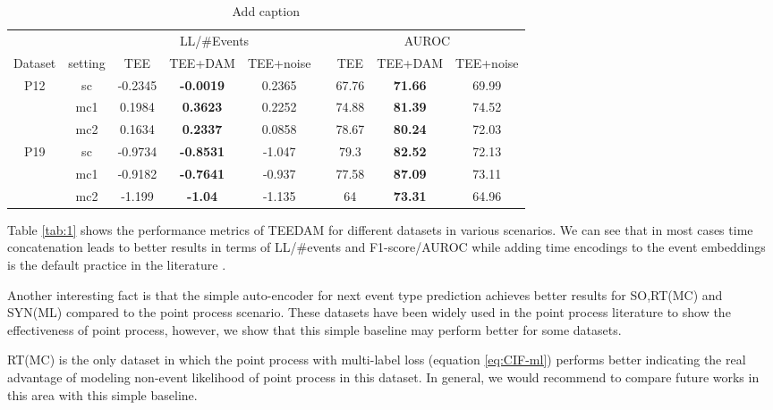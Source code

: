 \documentclass[journal,twoside,web]{ieeecolor}
\begin{document}
 
\begin{table}[htbp]
    \centering
    \caption{Add caption}
      \begin{tabular}{ccccccccc}
      \toprule
      \toprule
            &       & \multicolumn{3}{c}{LL/\#Events} &       & \multicolumn{3}{c}{AUROC} \\
  \cmidrule{3-5}\cmidrule{7-9}    Dataset & setting & TEE   & TEE+DAM & TEE+noise &       & TEE   & TEE+DAM & TEE+noise \\
      \midrule
      \multirow{3}[2]{*}{P12} & sc    & -0.2345 & \textbf{-0.0019} & 0.2365 &       & 67.76 & \textbf{71.66} & 69.99 \\
            & mc1   & 0.1984 & \textbf{0.3623} & 0.2252 &       & 74.88 & \textbf{81.39} & 74.52 \\
            & mc2   & 0.1634 & \textbf{0.2337} & 0.0858 &       & 78.67 & \textbf{80.24} & 72.03 \\
      \midrule
      \multirow{3}[2]{*}{P19} & sc    & -0.9734 & \textbf{-0.8531} & -1.047 &       & 79.3  & \textbf{82.52} & 72.13 \\
            & mc1   & -0.9182 & \textbf{-0.7641} & -0.937 &       & 77.58 & \textbf{87.09} & 73.11 \\
            & mc2   & -1.199 & \textbf{-1.04} & -1.135 &       & 64    & \textbf{73.31} & 64.96 \\
      \bottomrule
      \bottomrule
      \end{tabular}%
    \label{tab:2}%
  \end{table}%

Table \ref{tab:1} shows the performance metrics of TEEDAM for different datasets in various scenarios. We can see that in most cases time concatenation leads to better results in terms of LL/\#events and F1-score/AUROC while adding time encodings to the event embeddings is the default practice in the literature \cite*{zhangSelfAttentiveHawkesProcess2020,zuoTransformerHawkesProcess2020a}.

Another interesting fact is that the simple auto-encoder for next event type prediction achieves better results for SO,RT(MC) and SYN(ML) compared to the point process scenario. These datasets have been widely used in the point process literature to show the effectiveness of point process, however, we show that this simple baseline may perform better for some datasets.

RT(MC) is the only dataset in which the point process with multi-label loss (equation \ref*{eq:CIF-ml}) performs better indicating the real advantage of modeling non-event likelihood of point process in this dataset. In general, we would recommend to compare future works in this area with this simple baseline.
\end{document}
